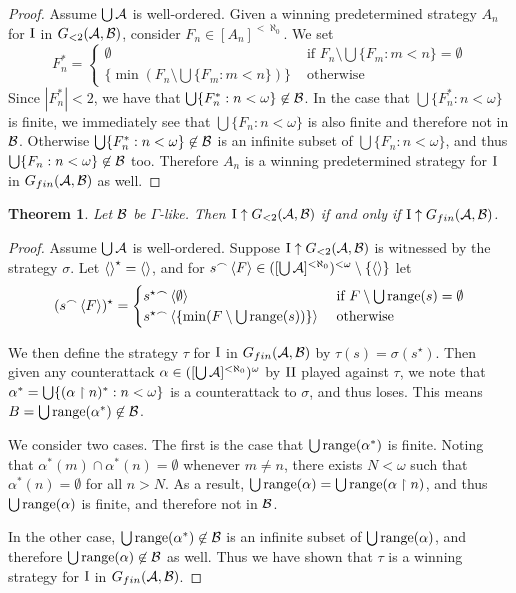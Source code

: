 \documentclass{amsart}
\theoremstyle{plain}
\newtheorem{theorem}{Theorem}
\theoremstyle{definition}
\theoremstyle{remark}
\theoremstyle{plain}
\theoremstyle{definition}
\theoremstyle{remark}
\begin{document}
\begin{proof}
Assume \(\bigcup\mathcal{A}\) is well-ordered.
Given a winning predetermined strategy \(A_n\) for \(\mathrm{I}\) in
\(G_{<2}(\mathcal{A},\mathcal{B})\), consider \(F_n\in[A_n]^{<\aleph_0}\). We set
\[
  F_n^*
=
  \begin{cases}
    \emptyset
      & \text{ if }
    F_n\setminus\bigcup\{F_m:m<n\}=\emptyset
      \\
    \{\min(
      F_n\setminus\bigcup\{F_m:m<n\}
    )\}
      & \text{ otherwise}
  \end{cases}
\]
Since \(|F_n^*|<2\), we have that \(\bigcup\{F_n^*:n<\omega\}\not\in\mathcal{B}\).
In the case that \(\bigcup\{F_n^*:n<\omega\}\) is finite, we immediately
see that \(\bigcup\{F_n:n<\omega\}\) is also finite and therefore not
in \(\mathcal{B}\). Otherwise \(\bigcup\{F_n^*:n<\omega\}\not\in\mathcal{B}\)
is an infinite subset of \(\bigcup\{F_n:n<\omega\}\), and thus
\(\bigcup\{F_n:n<\omega\}\not\in\mathcal{B}\) too. Therefore
\(A_n\) is a winning predetermined strategy for \(\mathrm{I}\) in
\(G_{fin}(\mathcal{A},\mathcal{B})\) as well.
\end{proof}

\begin{theorem}
Let \(\mathcal{B}\) be \(\Gamma\)-like. Then \(\mathrm{I}\uparrow G_{<2}(\mathcal{A},\mathcal{B})\)
if and only if \(\mathrm{I}\uparrow G_{fin}(\mathcal{A},\mathcal{B})\).
\end{theorem}

\begin{proof}
Assume \(\bigcup\mathcal{A}\) is well-ordered.
Suppose \(\mathrm{I}\uparrow G_{<2}(\mathcal{A},\mathcal{B})\) is witnessed by the strategy
\(\sigma\). Let \(\left\langle \right\rangle^\star=\left\langle \right\rangle\), and for 
\(s{^\frown}\left\langle F\right\rangle\in([\bigcup\mathcal{A}]^{<\aleph_0})^{<\omega}
\setminus\{\left\langle \right\rangle\}\) let 
\[
  (s{^\frown}\left\langle F\right\rangle)^\star
=
  \begin{cases}
    s^\star{^\frown}\left\langle \emptyset\right\rangle
      & \text{ if }
    F\setminus\bigcup\text{range}(s)=\emptyset
      \\
    s^\star{^\frown}\left\langle 
      \{\min(F\setminus\bigcup\text{range}(s))\}
    \right\rangle
      & \text{ otherwise}
  \end{cases}
\]

We then define the strategy \(\tau\) for \(\mathrm{I}\) in \(G_{fin}(\mathcal{A},\mathcal{B})\)
by \(\tau(s)=\sigma(s^\star)\). Then given any counterattack
\(\alpha\in([\bigcup\mathcal{A}]^{<\aleph_0})^\omega\) by \(\mathrm{II}\) played against 
\(\tau\), we note that \(\alpha^*=\bigcup\{(\alpha\restriction n)^*:n<\omega\}\)
is a counterattack to \(\sigma\), and thus loses.
This means \(B=\bigcup\text{range}(\alpha^*)\not\in\mathcal{B}\).

We consider two cases. The first is the case that \(\bigcup\text{range}(\alpha^*)\)
is finite. Noting that \(\alpha^*(m)\cap\alpha^*(n)=\emptyset\) whenever
\(m\not=n\), there exists \(N<\omega\) such that 
\(\alpha^*(n)=\emptyset\) for all \(n>N\). As a result,
\(\bigcup\text{range}(\alpha)=\bigcup\text{range}(\alpha\restriction n)\), and thus
\(\bigcup\text{range}(\alpha)\) is finite, and therefore not in \(\mathcal{B}\).

In the other case, \(\bigcup\text{range}(\alpha^*)\not\in\mathcal{B}\) is an 
infinite subset of \(\bigcup\text{range}(\alpha)\), and therefore 
\(\bigcup\text{range}(\alpha)\not\in\mathcal{B}\) as well. Thus we have shown
that \(\tau\) is a winning strategy for \(\mathrm{I}\) in
\(G_{fin}(\mathcal{A},\mathcal{B})\).
\end{proof}
\end{document}
